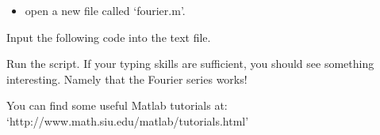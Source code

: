 \documentclass[letter]{article}
\begin{document}
\begin{itemize}
\item open a new file called `fourier.m'.
\end{itemize}

Input the following code into the text file.



Run the script.  If your typing skills are sufficient, you should
see something interesting.  Namely that the Fourier series works!


You can find some useful Matlab tutorials at:
`http://www.math.siu.edu/matlab/tutorials.html'
\end{document}
